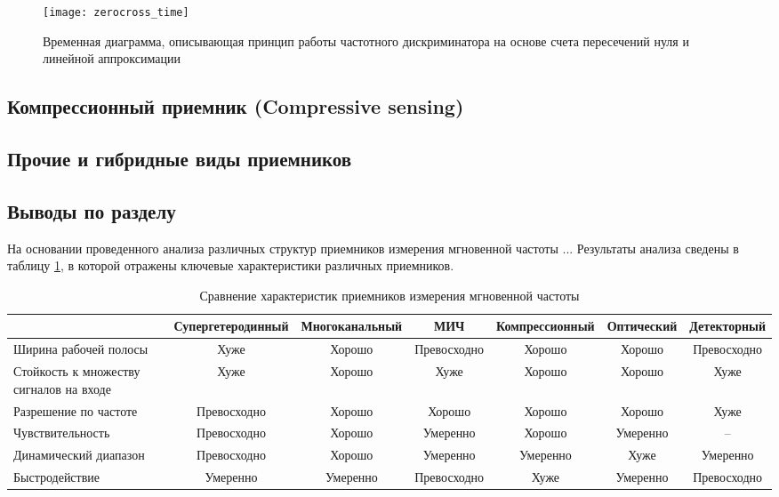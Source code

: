 \begin{figure}[ht]
	\centering
	\texttt{[image: zerocross\_time]}
	
	\caption{Временная диаграмма, описывающая принцип работы частотного дискриминатора на основе счета пересечений нуля и линейной аппроксимации}
	\label{ct:zerocross_time}
\end{figure}

\subsection{Компрессионный приемник (Compressive sensing)}

\subsection{Прочие и гибридные виды приемников}

\subsection{Выводы по разделу}

На основании проведенного анализа различных структур приемников измерения мгновенной частоты ...
Результаты анализа сведены в таблицу \ref{t:survey}, в которой отражены ключевые характеристики различных приемников.

\begin{table}
\caption{Сравнение характеристик приемников измерения мгновенной частоты\label{t:survey}}
	\begin{adjustbox}{width=\columnwidth,center}
		
		\begin{tabular}{@{}m{8em}cccccc@{}}
			\toprule
													&	Супергетеродинный	& Многоканальный & МИЧ & Компрессионный & Оптический & Детекторный\\
			\midrule
			Ширина рабочей полосы					&	Хуже 				& Хорошо	& Превосходно	& Хорошо & Хорошо & Превосходно\\
			Стойкость к множеству сигналов на входе &	Хуже 				& Хорошо	& Хуже	& Хорошо & Хорошо & Хуже\\
			Разрешение по частоте 					& 	Превосходно 		& Хорошо	& Хорошо	& Хорошо & Хорошо & Хуже\\
			Чувствительность 						& 	Превосходно 		& Хорошо	& Умеренно	& Хорошо & Умеренно & --\\
			Динамический диапазон 					& 	Превосходно 		& Хорошо	& Умеренно	& Умеренно & Хуже & Умеренно\\
			Быстродействие							&	Умеренно			& Умеренно	& Превосходно & Хуже	& Умеренно & Превосходно \\
			\bottomrule
		\end{tabular}
	\end{adjustbox}
\end{table}

